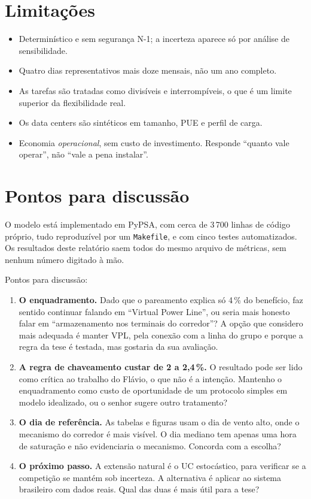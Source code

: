 \documentclass[11pt,a4paper]{article}
\begin{document}
\section{Limitações}

\begin{itemize}
\item Determinístico e sem segurança N-1; a incerteza aparece só por análise de sensibilidade.
\item Quatro dias representativos mais doze mensais, não um ano completo.
\item As tarefas são tratadas como divisíveis e interrompíveis, o que é um limite superior da
flexibilidade real.
\item Os data centers são sintéticos em tamanho, PUE e perfil de carga.
\item Economia \emph{operacional}, sem custo de investimento. Responde ``quanto vale operar'', não ``vale
a pena instalar''.
\end{itemize}

\section{Pontos para discussão}

O modelo está implementado em PyPSA, com cerca de 3\,700 linhas de código próprio, tudo reproduzível por
um \texttt{Makefile}, e com cinco testes automatizados. Os resultados deste relatório saem todos do mesmo
arquivo de métricas, sem nenhum número digitado à mão.

Pontos para discussão:

\begin{enumerate}
\item \textbf{O enquadramento.} Dado que o pareamento explica só 4\,\% do benefício, faz sentido continuar
falando em ``Virtual Power Line'', ou seria mais honesto falar em ``armazenamento nos terminais do
corredor''? A opção que considero mais adequada é manter VPL, pela conexão com a linha do grupo e porque a regra da
tese é testada, mas gostaria da sua avaliação.
\item \textbf{A regra de chaveamento custar de 2 a 2{,}4\,\%.} O resultado pode ser lido como crítica ao
trabalho do Flávio, o que não é a intenção. Mantenho o enquadramento como custo de oportunidade de um
protocolo simples em modelo idealizado, ou o senhor sugere outro tratamento?
\item \textbf{O dia de referência.} As tabelas e figuras usam o dia de vento alto, onde o mecanismo do corredor é mais visível. O dia mediano tem apenas uma hora de saturação e não evidenciaria o mecanismo. Concorda com a escolha?
\item \textbf{O próximo passo.} A extensão natural é o UC estocástico, para verificar se a
competição se mantém sob incerteza. A alternativa é aplicar ao sistema brasileiro com dados reais. Qual
das duas é mais útil para a tese?
\end{enumerate}
\end{document}
